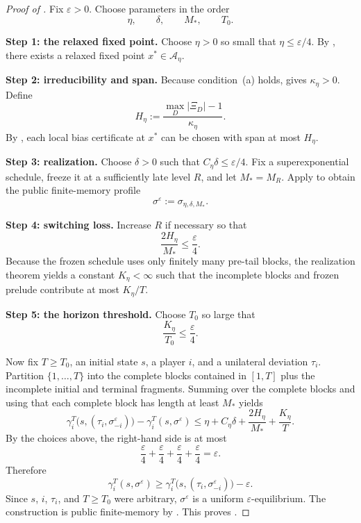 \documentclass[12pt]{article}
\theoremstyle{definition}
\newcommand{\eps}{\varepsilon}
\newcommand{\1}{\mathbf{1}}
\newcommand{\cA}{\mathcal{A}}
\begin{document}
\begin{proof}[Proof of ]
Fix \(\eps>0\).  Choose parameters in the order
\[
\eta,\qquad \delta,\qquad M_*,\qquad T_0.
\]

\smallskip
\noindent\textbf{Step 1: the relaxed fixed point.}
Choose \(\eta>0\) so small that \(\eta\le \eps/4\).  By , there exists
a relaxed fixed point \(x^*\in \cA_\eta\).

\smallskip
\noindent\textbf{Step 2: irreducibility and span.}
Because condition~(a) holds,  gives \(\kappa_\eta>0\).  Define
\[
H_\eta:=\frac{\max_D|\Xi_D|-1}{\kappa_\eta}.
\]
By , each local bias certificate at \(x^*\) can be chosen with span
at most \(H_\eta\).

\smallskip
\noindent\textbf{Step 3: realization.}
Choose \(\delta>0\) such that \(C_\eta\delta\le \eps/4\).  Fix a superexponential schedule,
freeze it at a sufficiently late level \(R\), and let \(M_*=M_R\).  Apply
 to obtain the public finite-memory profile
\[
\sigma^\eps:=\sigma_{\eta,\delta,M_*}.
\]

\smallskip
\noindent\textbf{Step 4: switching loss.}
Increase \(R\) if necessary so that
\[
\frac{2H_\eta}{M_*}\le \frac{\eps}{4}.
\]
Because the frozen schedule uses only finitely many pre-tail blocks, the realization
theorem yields a constant \(K_\eta<\infty\) such that the incomplete blocks and frozen
prelude contribute at most \(K_\eta/T\).

\smallskip
\noindent\textbf{Step 5: the horizon threshold.}
Choose \(T_0\) so large that
\[
\frac{K_\eta}{T_0}\le \frac{\eps}{4}.
\]

Now fix \(T\ge T_0\), an initial state \(s\), a player \(i\), and a unilateral deviation
\(\tau_i\).  Partition \(\{1,\dots,T\}\) into the complete blocks contained in \([1,T]\)
plus the incomplete initial and terminal fragments.  Summing
 over the complete blocks and using that each complete block has
length at least \(M_*\) yields
\[
\gamma_i^T\bigl(s,(\tau_i,\sigma^\eps_{-i})\bigr)
-
\gamma_i^T(s,\sigma^\eps)
\le
\eta + C_\eta\delta + \frac{2H_\eta}{M_*} + \frac{K_\eta}{T}.
\]
By the choices above, the right-hand side is at most
\[
\frac{\eps}{4}+\frac{\eps}{4}+\frac{\eps}{4}+\frac{\eps}{4}=\eps.
\]
Therefore
\[
\gamma_i^T(s,\sigma^\eps)
\ge
\gamma_i^T\bigl(s,(\tau_i,\sigma^\eps_{-i})\bigr)-\eps.
\]
Since \(s\), \(i\), \(\tau_i\), and \(T\ge T_0\) were arbitrary, \(\sigma^\eps\) is a
uniform \(\eps\)-equilibrium.  The construction is public finite-memory by
.  This proves .
\end{proof}
\end{document}
